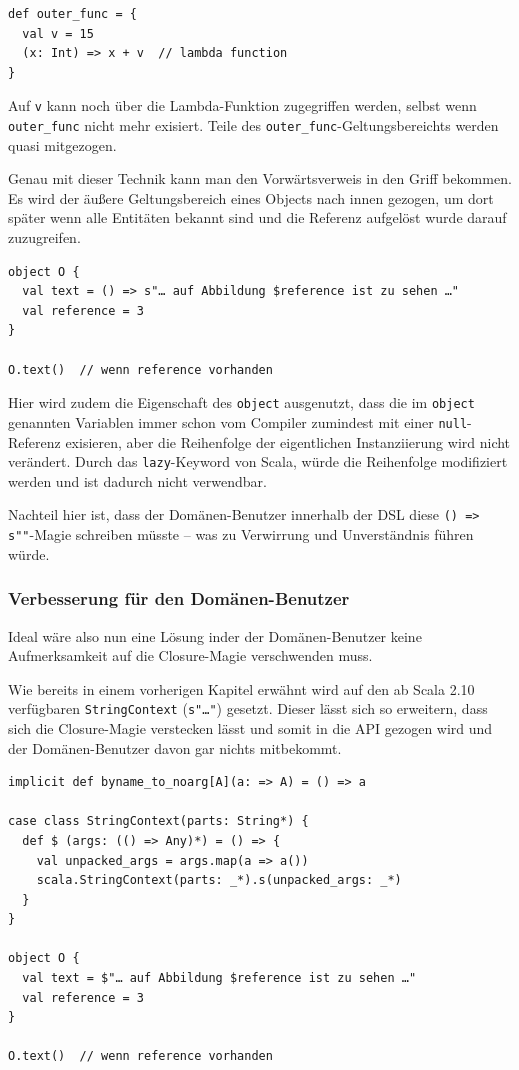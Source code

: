 \begin{lstlisting}
def outer_func = {
  val v = 15
  (x: Int) => x + v  // lambda function
}
\end{lstlisting}

Auf \lstinline|v| kann noch über die Lambda-Funktion zugegriffen werden,
selbst wenn \lstinline|outer_func| nicht mehr exisiert. Teile des
\lstinline|outer_func|-Geltungsbereichts werden quasi mitgezogen.

Genau mit dieser Technik kann man den Vorwärtsverweis in den Griff bekommen.
Es wird der äußere Geltungsbereich eines Objects nach innen gezogen,
um dort später wenn alle Entitäten bekannt sind und die Referenz aufgelöst
wurde darauf zuzugreifen.

\begin{lstlisting}
object O {
  val text = () => s"… auf Abbildung $reference ist zu sehen …"
  val reference = 3
}

O.text()  // wenn reference vorhanden
\end{lstlisting}

Hier wird zudem die Eigenschaft des \lstinline|object| ausgenutzt,
dass die im \lstinline|object| genannten Variablen immer schon vom Compiler
zumindest mit einer \lstinline|null|-Referenz exisieren, aber die Reihenfolge
der eigentlichen Instanziierung wird nicht verändert. Durch das
\lstinline|lazy|-Keyword von Scala, würde die Reihenfolge modifiziert werden
und ist dadurch nicht verwendbar.

Nachteil hier ist, dass der Domänen-Benutzer innerhalb der DSL diese
\lstinline|() => s""|-Magie schreiben müsste -- was zu Verwirrung und
Unverständnis führen würde.


\subsubsection{Verbesserung für den Domänen-Benutzer}

Ideal wäre also nun eine Lösung inder der Domänen-Benutzer keine
Aufmerksamkeit auf die Closure-Magie verschwenden muss.

Wie bereits in einem vorherigen Kapitel %
erwähnt wird auf den ab Scala 2.10 verfügbaren
\lstinline|StringContext| (\lstinline|s"…"|) gesetzt.
Dieser lässt sich so erweitern, dass
sich die Closure-Magie verstecken lässt und somit in die API
gezogen wird und der Domänen-Benutzer davon gar nichts mitbekommt.

\begin{lstlisting}
implicit def byname_to_noarg[A](a: => A) = () => a

case class StringContext(parts: String*) {
  def $ (args: (() => Any)*) = () => {
    val unpacked_args = args.map(a => a())
    scala.StringContext(parts: _*).s(unpacked_args: _*)
  }
}

object O {
  val text = $"… auf Abbildung $reference ist zu sehen …"
  val reference = 3
}

O.text()  // wenn reference vorhanden
\end{lstlisting}

